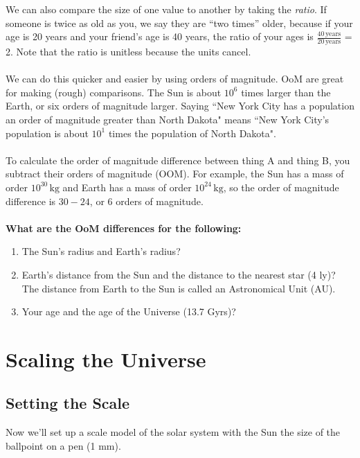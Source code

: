 \documentclass[11pt]{article}
\begin{document}
\noindent
We can also compare the size of one value to another by taking the \textit{ratio}.  If someone is twice as old as you, we say they are ``two times'' older, because if your age is 20 years and your friend's age is 40 years, the ratio of your ages is $\frac{40 \,\mathrm{years}}{20 \,\mathrm{years}}$ = 2. Note that the ratio is unitless because the units cancel.
\\ \\ \noindent
We can do this quicker and easier by using orders of magnitude. OoM are great for making (rough) comparisons. The Sun is about $10^6$ times larger than the Earth, or six orders of magnitude larger.  Saying ``New York City has a population an order of magnitude greater than North Dakota" means ``New York City's population is about $10^1$ times the population of North Dakota". 
\\ \\ \noindent
To calculate the order of magnitude difference between thing A and thing B, you subtract their orders of magnitude (OOM). For example, the Sun has a mass of order $10^{30}\,\mathrm{kg}$ and Earth has a mass of order $10^{24}\,\mathrm{kg}$, so the order of magnitude difference is $30 - 24$, or $6$ orders of magnitude.
\\ \\ \noindent
\textbf{What are the OoM differences for the following:}
\begin{enumerate}
    \item The Sun's radius and Earth's radius?
    \item Earth's distance from the Sun and the distance to the nearest star (4 ly)? The distance from Earth to the Sun is called an Astronomical Unit (AU).
    \item Your age and the age of the Universe (13.7 Gyrs)?
\end{enumerate}


\section{Scaling the Universe}

\subsection{Setting the Scale}

Now we'll set up a scale model of the solar system with the Sun the size of the ballpoint on a pen (1 mm).
\end{document}
